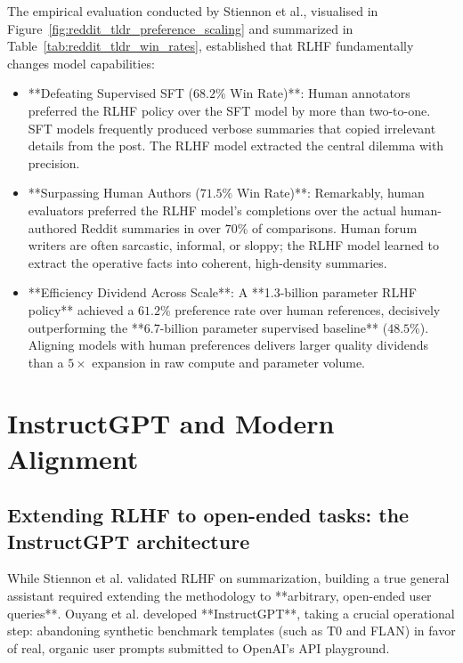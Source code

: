 \documentclass[../../../main.tex]{subfiles}
\begin{document}
The empirical evaluation conducted by Stiennon et al., visualised in Figure~\ref{fig:reddit_tldr_preference_scaling} and summarized in Table~\ref{tab:reddit_tldr_win_rates}, established that RLHF fundamentally changes model capabilities:
\begin{itemize}
    \item **Defeating Supervised SFT ($68.2\%$ Win Rate)**: Human annotators preferred the RLHF policy over the SFT model by more than two-to-one. SFT models frequently produced verbose summaries that copied irrelevant details from the post. The RLHF model extracted the central dilemma with precision.
    \item **Surpassing Human Authors ($71.5\%$ Win Rate)**: Remarkably, human evaluators preferred the RLHF model's completions over the actual human-authored Reddit summaries in over $70\%$ of comparisons. Human forum writers are often sarcastic, informal, or sloppy; the RLHF model learned to extract the operative facts into coherent, high-density summaries.
    \item **Efficiency Dividend Across Scale**: A **1.3-billion parameter RLHF policy** achieved a $61.2\%$ preference rate over human references, decisively outperforming the **6.7-billion parameter supervised baseline** ($48.5\%$). Aligning models with human preferences delivers larger quality dividends than a $5\times$ expansion in raw compute and parameter volume.
\end{itemize}

\section{InstructGPT and Modern Alignment}
\label{sec:instructgpt_modern_paradigm}

\subsection{Extending RLHF to open-ended tasks: the InstructGPT architecture}
\label{subsec:instructgpt_architecture_pipeline}

While Stiennon et al. validated RLHF on summarization, building a true general assistant required extending the methodology to **arbitrary, open-ended user queries**. Ouyang et al. \citep{ouyang2022} developed **InstructGPT**, taking a crucial operational step: abandoning synthetic benchmark templates (such as T0 and FLAN) in favor of real, organic user prompts submitted to OpenAI's API playground.
\end{document}
